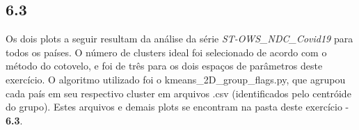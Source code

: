\begin{figure}[ht!]
	\vspace{0mm}	%
	\begin{center}
	\end{center}
	\vspace{-2mm}	%
	\label{ex6_fig3}
\end{figure}

\clearpage
\subsection*{6.3}
%

Os dois plots a seguir resultam da análise da série \textit{ST-OWS\_NDC\_Covid19} para todos os países. O número de clusters ideal foi selecionado de acordo com o método do cotovelo, e foi de três para os dois espaços de parâmetros deste exercício. O algoritmo utilizado foi o kmeans\_2D\_group\_flags.py, que agrupou cada país em seu respectivo cluster em arquivos .csv (identificados pelo centróide do grupo). Estes arquivos e demais plots se encontram na pasta deste exercício - \textbf{6.3}. 

